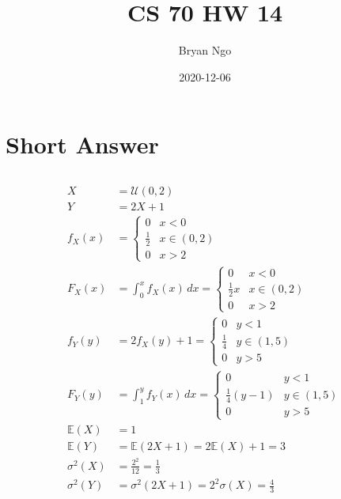 \documentclass{article}
\title{CS 70 HW 14}
\author{Bryan Ngo}
\date{2020-12-06}
\newcommand{\E}{\mathbb{E}}
\begin{document}
\maketitle

\section{Short Answer}

\subsection{}

\begin{align}
    X &= \mathcal{U}(0, 2) \\
    Y &= 2X + 1 \\
    f_X(x) &=
    \begin{cases}
        0 & x < 0 \\
        \frac{1}{2} & x \in (0, 2) \\
        0 & x > 2
    \end{cases} \\
    F_X(x) &= \int_0^x f_X(x) \, dx =
    \begin{cases}
        0 & x < 0 \\
        \frac{1}{2}x & x \in (0, 2) \\
        0 & x > 2
    \end{cases} \\
    f_Y(y) &= 2f_X(y) + 1 =
    \begin{cases}
        0 & y < 1 \\
        \frac{1}{4} & y \in (1, 5) \\
        0 & y > 5
    \end{cases} \\
    F_Y(y) &= \int_1^y f_Y(x) \, dx =
    \begin{cases}
        0 & y < 1 \\
        \frac{1}{4}(y - 1) & y \in (1, 5) \\
        0 & y > 5
    \end{cases} \\
    \E(X) &= 1 \\
    \E(Y) &= \E(2X + 1) = 2\E(X) + 1 = 3 \\
    \sigma^2(X) &= \frac{2^2}{12} = \frac{1}{3} \\
    \sigma^2(Y) &= \sigma^2(2X + 1) = 2^2 \sigma(X) = \frac{4}{3}
\end{align}
\end{document}
